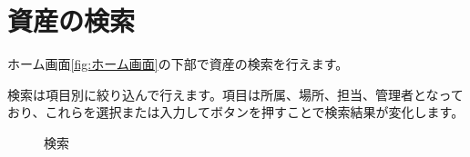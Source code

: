 \documentclass[11ptm]{jsarticle}
\begin{document}
\section{資産の検索}
\label{sec:資産の検索}
ホーム画面\ref{fig:ホーム画面}の下部で資産の検索を行えます。\par
検索は項目別に絞り込んで行えます。項目は所属、場所、担当、管理者となっており、これらを選択または入力してボタンを押すことで検索結果が変化します。
\begin{figure}[h]
  \centering
  \caption{\label{fig:検索}検索}
\end{figure}


\clearpage
\end{document}
